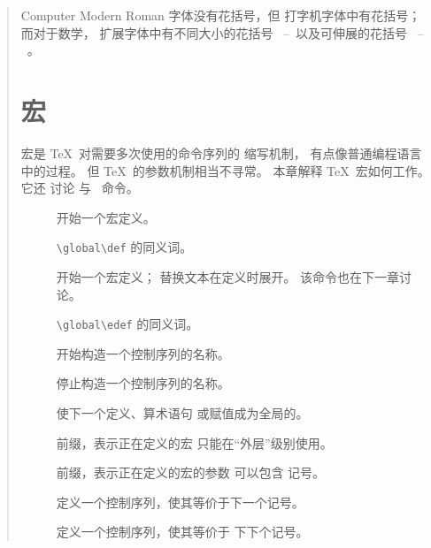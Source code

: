 \documentclass[a4paper]{rapport3}
\def\ldash{\unskip\ --\nobreak\ \ignorespaces}
\def\rdash{\unskip\nobreak\ --\ \ignorespaces}
\newenvironment{disp}{\begin{quotation}}{\end{quotation}}
\newenvironment{inventory}{\begin{description}}{\end{description}}
\begin{document}
\begin{disp}
Computer Modern Roman 字体没有花括号，但
打字机字体中有花括号；而对于数学，
扩展字体中有不同大小的花括号 \ldash 以及可伸展的花括号 \rdash。


\endofchapter
\chapter{宏}\label{macro}

宏是 \TeX\ 对需要多次使用的命令序列的
缩写机制，
有点像普通编程语言中的过程。
但 \TeX\ 的参数机制相当不寻常。
本章解释 \TeX\ 宏如何工作。它还
讨论  与~ 命令。

\begin{inventory}
\item [] 
      开始一个宏定义。

\item [] 
      \verb-\global\def- 的同义词。

\item [] 
      开始一个宏定义；
      替换文本在定义时展开。
      该命令也在下一章讨论。

\item [] 
      \verb-\global\edef- 的同义词。

\item [] 
      开始构造一个控制序列的名称。

\item [] 
      停止构造一个控制序列的名称。

\item [] 
      使下一个定义、算术语句
      或赋值成为全局的。

\item [] 
      前缀，表示正在定义的宏
      只能在“外层”级别使用。

\item [] 
      前缀，表示正在定义的宏的参数
      可以包含  记号。

\item [] 
      定义一个控制序列，使其等价于下一个记号。

\item [] 
      定义一个控制序列，使其等价于
      下下个记号。

\end{inventory}


\end{disp}
\end{document}
